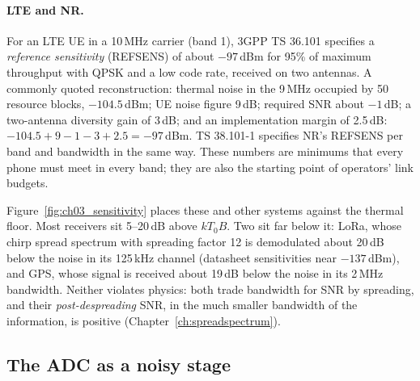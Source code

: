\paragraph{LTE and NR.} For an LTE UE in a 10\,MHz carrier (band 1), 3GPP TS 36.101 specifies a
\emph{reference sensitivity} (REFSENS) of about $-97$\,dBm for 95\% of maximum throughput with QPSK and a
low code rate, received on two antennas. A commonly quoted reconstruction: thermal noise in the 9\,MHz
occupied by 50 resource blocks, $-104.5$\,dBm; UE noise figure 9\,dB; required SNR about $-1$\,dB; a
two-antenna diversity gain of 3\,dB; and an implementation margin of 2.5\,dB:
$-104.5+9-1-3+2.5=-97$\,dBm. TS 38.101-1 specifies NR's REFSENS per band and bandwidth in the same way.
These numbers are minimums that every phone must meet in every band; they are also the starting point of
operators' link budgets.

Figure~\ref{fig:ch03_sensitivity} places these and other systems against the thermal floor. Most receivers
sit 5--20\,dB above $kT_0B$. Two sit far below it: LoRa, whose chirp spread spectrum with spreading factor
12 is demodulated about 20\,dB below the noise in its 125\,kHz channel (datasheet sensitivities near
$-137$\,dBm), and GPS, whose signal is received about 19\,dB below the noise in its 2\,MHz bandwidth.
Neither violates physics: both trade bandwidth for SNR by spreading, and their \emph{post-despreading}
SNR, in the much smaller bandwidth of the information, is positive (Chapter~\ref{ch:spreadspectrum}).


\subsection{The ADC as a noisy stage}
\label{sec:ch03:adcfloor}

